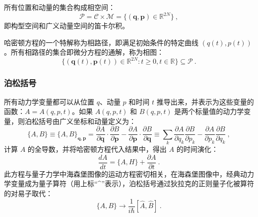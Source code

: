 所有位置和动量的集合构成相空间：
\[
\mathcal{P} = \mathcal{C} \times \mathcal{M} = \{ (\mathbf{q}, \mathbf{p}) \in \mathbb{R}^{2N} \} ~,
\]
即构型空间和广义动量空间的笛卡尔积。

哈密顿方程的一个特解称为相路径，即满足初始条件的特定曲线 \((q(t), p(t))\)。所有相路径的集合即微分方程的通解，称为相图：
\[
\{ (\mathbf{q}(t), \mathbf{p}(t)) \in \mathbb{R}^{2N} : t \geq 0, t \in \mathbb{R} \} \subseteq \mathcal{P} ~.
\]
\subsubsection{泊松括号}  
所有动力学变量都可以从位置 \( q \)、动量 \( p \) 和时间 \( t \) 推导出来，并表示为这些变量的函数：\( A = A(q, p, t) \)。如果 \( A(q, p, t) \) 和 \( B(q, p, t) \) 是两个标量值的动力学变量，则泊松括号由广义坐标和动量定义为：
\[
\{A, B\} \equiv \{A, B\}_{\mathbf{q}, \mathbf{p}} = \frac{\partial A}{\partial \mathbf{q}} \cdot \frac{\partial B}{\partial \mathbf{p}} - \frac{\partial A}{\partial \mathbf{p}} \cdot \frac{\partial B}{\partial \mathbf{q}} \equiv \sum_k \frac{\partial A}{\partial q_k} \frac{\partial B}{\partial p_k} - \frac{\partial A}{\partial p_k} \frac{\partial B}{\partial q_k} ~,
\]
计算 \( A \) 的全导数，并将哈密顿方程代入结果中，得出 \( A \) 的时间演化：
\[
\frac{dA}{dt} = \{A, H\} + \frac{\partial A}{\partial t} ~.
\]
此方程与量子力学中海森堡图像的运动方程密切相关，在海森堡图像中，经典动力学变量成为量子算符（用上标“^”表示），泊松括号通过狄拉克的正则量子化被算符的对易子取代：
\[
\{A, B\} \rightarrow \frac{1}{i \hbar} [\hat{A}, \hat{B}] ~.
\]

